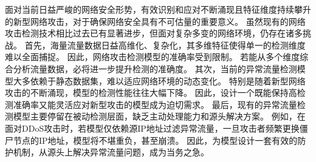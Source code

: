 面对当前日益严峻的网络安全形势，有效识别和应对不断涌现且特征维度持续攀升的新型网络攻击，对于确保网络安全具有不可估量的重要意义。
虽然现有的网络攻击检测技术相比过去已有显著进步，但面对复杂多变的网络环境，仍存在诸多挑战。
首先，海量流量数据日益高维化、复杂化，其多维特征使得单一的检测维度难以全面捕捉。
因此，网络攻击检测模型的准确率受到限制。
若能从多个维度综合分析流量数据，必将进一步提升检测的准确度。
其次，当前的异常流量检测模型大多依赖于静态数据集，难以适应网络环境的动态变化。
特别是随着新型网络攻击的不断涌现，模型的检测性能往往大幅下降。
因此，设计一个既能保持高检测准确率又能灵活应对新型攻击的模型成为迫切需求。
最后，现有的异常流量检测模型主要停留在被动检测层面，缺乏主动处理能力和源头解决方案。
例如，在面对DDoS攻击时，若模型仅依赖源IP地址过滤异常流量，一旦攻击者频繁更换僵尸节点的IP地址，模型将不堪重负，甚至崩溃。
因此，为模型设计一套有效的防护机制，从源头上解决异常流量问题，成为当务之急。





